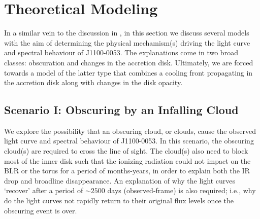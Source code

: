 \documentclass[a4paper,fleqn,usenatbib]{mnras}
\begin{document}
\section{Theoretical Modeling} 
In a similar vein to the discussion in \cite{Stern2018}, in this
section we discuss several models with the aim of determining the
physical mechamism(s) driving the light curve and spectral behaviour
of J1100-0053. The explanations come in two broad classes: obscuration
and changes in the accretion disk.  Ultimately, we are forced towards
a model of the latter type that combines a cooling front propagating
in the accretion disk along with changes in the disk opacity.

\subsection{Scenario I: Obscuring by an Infalling Cloud}
We explore the possibility that an obscuring cloud, or clouds, cause
the observed light curve and spectral behaviour of J1100-0053.  In
this scenario, the obscuring cloud(s) are required to cross the line
of sight. The cloud(s) also need to block most of the inner disk such
that the ionizing radiation could not impact on the BLR or the torus
for a period of months-years, in order to explain both the IR drop and
broadline disappearance. An explanation of why the light curves
`recover' after a period of $\sim 2500$ days (observed-frame) is also
required; i.e., why do the light curves not rapidly return to their
original flux levels once the obscuring event is over.
\end{document}
